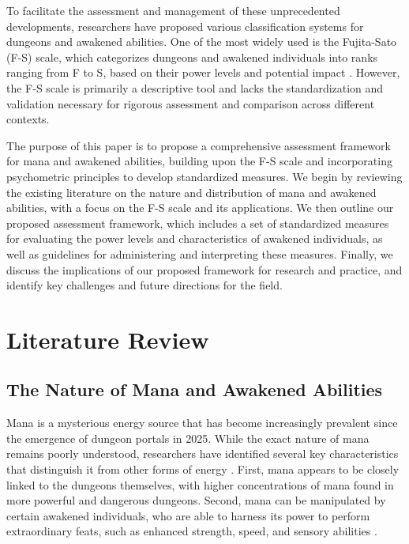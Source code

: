 \documentclass[12pt, a4paper]{article}
\begin{document}
To facilitate the assessment and management of these unprecedented developments, researchers have proposed various classification systems for dungeons and awakened abilities. One of the most widely used is the Fujita-Sato (F-S) scale, which categorizes dungeons and awakened individuals into ranks ranging from F to S, based on their power levels and potential impact \citep{Fujita2026}. However, the F-S scale is primarily a descriptive tool and lacks the standardization and validation necessary for rigorous assessment and comparison across different contexts.

The purpose of this paper is to propose a comprehensive assessment framework for mana and awakened abilities, building upon the F-S scale and incorporating psychometric principles to develop standardized measures. We begin by reviewing the existing literature on the nature and distribution of mana and awakened abilities, with a focus on the F-S scale and its applications. We then outline our proposed assessment framework, which includes a set of standardized measures for evaluating the power levels and characteristics of awakened individuals, as well as guidelines for administering and interpreting these measures. Finally, we discuss the implications of our proposed framework for research and practice, and identify key challenges and future directions for the field.

\section{Literature Review}

\subsection{The Nature of Mana and Awakened Abilities}

Mana is a mysterious energy source that has become increasingly prevalent since the emergence of dungeon portals in 2025. While the exact nature of mana remains poorly understood, researchers have identified several key characteristics that distinguish it from other forms of energy \citep{Nakamura2026, Kimura2026}. First, mana appears to be closely linked to the dungeons themselves, with higher concentrations of mana found in more powerful and dangerous dungeons. Second, mana can be manipulated by certain awakened individuals, who are able to harness its power to perform extraordinary feats, such as enhanced strength, speed, and sensory abilities \citep{Sato2027}.
\end{document}
